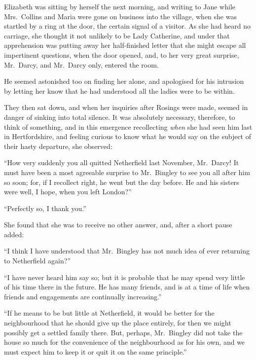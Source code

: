 \documentclass[12pt,english]{book}
\begin{document}

Elizabeth was sitting by herself the next morning, and writing to
Jane while Mrs.\ Collins and Maria were gone on business into the
village, when she was startled by a ring at the door, the certain
signal of a visitor. As she had heard no carriage, she thought it
not unlikely to be Lady Catherine, and under that apprehension was
putting away her half-finished letter that she might escape all impertinent
questions, when the door opened, and, to her very great surprise,
Mr.\ Darcy, and Mr.\ Darcy only, entered the room.

He seemed astonished too on finding her alone, and apologised for
his intrusion by letting her know that he had understood all the ladies
were to be within.

They then sat down, and when her inquiries after Rosings were made,
seemed in danger of sinking into total silence. It was absolutely
necessary, therefore, to think of something, and in this emergence
recollecting \textit{when} she had seen him last in Hertfordshire,
and feeling curious to know what he would say on the subject of their
hasty departure, she observed:

{}``How very suddenly you all quitted Netherfield last November,
Mr.\ Darcy! It must have been a most agreeable surprise to Mr.\ Bingley
to see you all after him so soon; for, if I recollect right, he went
but the day before. He and his sisters were well, I hope, when you
left London?''\ 

{}``Perfectly so, I thank you.''

She found that she was to receive no other answer, and, after a short
pause added:

{}``I think I have understood that Mr.\ Bingley has not much idea
of ever returning to Netherfield again?''\ 

{}``I have never heard him say so; but it is probable that he may
spend very little of his time there in the future. He has many friends,
and is at a time of life when friends and engagements are continually
increasing.''

{}``If he means to be but little at Netherfield, it would be better
for the neighbourhood that he should give up the place entirely, for
then we might possibly get a settled family there. But, perhaps, Mr.\ Bingley
did not take the house so much for the convenience of the neighbourhood
as for his own, and we must expect him to keep it or quit it on the
same principle.''
\end{document}
